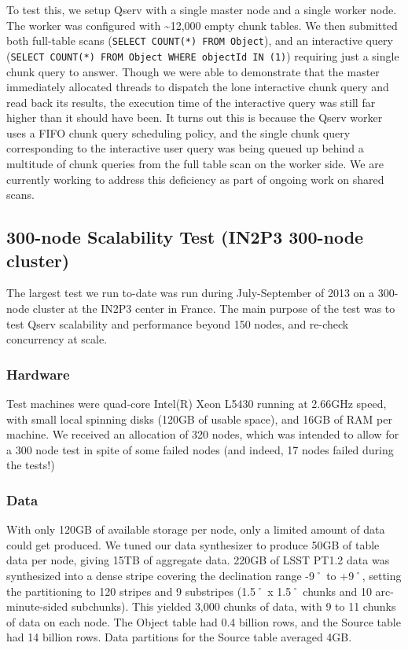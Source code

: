\documentclass[DM,lsstdraft,toc]{lsstdoc}
\begin{document}
To test this, we setup Qserv with a single master node and a single
worker node. The worker was configured with \textasciitilde{}12,000
empty chunk tables. We then submitted both full-table scans
(\texttt{SELECT\ COUNT(*)\ FROM\ Object}), and an interactive query
(\texttt{SELECT\ COUNT(*)\ FROM\ Object\ WHERE\ objectId\ IN\ (1)})
requiring just a single chunk query to answer. Though we were able to
demonstrate that the master immediately allocated threads to dispatch
the lone interactive chunk query and read back its results, the
execution time of the interactive query was still far higher than it
should have been. It turns out this is because the Qserv worker uses a
FIFO chunk query scheduling policy, and the single chunk query
corresponding to the interactive user query was being queued up behind a
multitude of chunk queries from the full table scan on the worker side.
We are currently working to address this deficiency as part of ongoing
work on shared scans.

\subsection{300-node Scalability Test (IN2P3 300-node
cluster)}\label{node-scalability-test-in2p3-300-node-cluster}

The largest test we run to-date was run during July-September of 2013 on
a 300-node cluster at the IN2P3 center in France. The main purpose of
the test was to test Qserv scalability and performance beyond 150 nodes,
and re-check concurrency at scale.

\subsubsection{Hardware}\label{hardware-1}

Test machines were quad-core Intel(R) Xeon L5430 running at 2.66GHz
speed, with small local spinning disks (120GB of usable space), and 16GB
of RAM per machine. We received an allocation of 320 nodes, which was
intended to allow for a 300 node test in spite of some failed nodes (and
indeed, 17 nodes failed during the tests!)

\subsubsection{Data}\label{data-1}

With only 120GB of available storage per node, only a limited amount of
data could get produced. We tuned our data synthesizer to produce 50GB
of table data per node, giving 15TB of aggregate data. 220GB of LSST
PT1.2 data was synthesized into a dense stripe covering the declination
range -9˚ to +9˚, setting the partitioning to 120 stripes and 9
substripes (1.5˚ x 1.5˚ chunks and 10 arc-minute-sided subchunks). This
yielded 3,000 chunks of data, with 9 to 11 chunks of data on each node.
The Object table had 0.4 billion rows, and the Source table had 14
billion rows. Data partitions for the Source table averaged 4GB.
\end{document}
